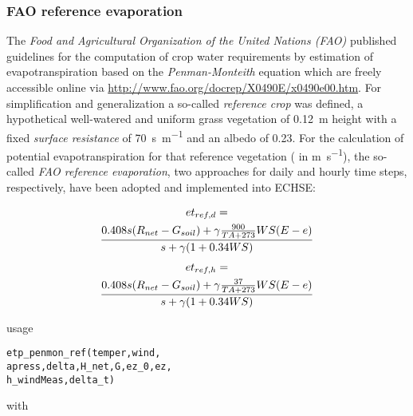 \subsubsection{FAO reference evaporation} \label{sec:et:fao_ref}
The \emph{Food and Agricultural Organization of the United Nations (FAO)} published guidelines for the computation of crop water requirements by estimation of evapotranspiration based on the \emph{Penman-Monteith} equation which are freely accessible online via \url{http://www.fao.org/docrep/X0490E/x0490e00.htm}. For simplification and generalization a so-called \emph{reference crop} was defined, a hypothetical well-watered and uniform grass vegetation of \SI{0.12}{\metre} height with a fixed \emph{surface resistance} of \SI{70}{\second\per\metre} and an albedo of \num{0.23}. For the calculation of potential evapotranspiration for that reference vegetation (\etRef{} in \si{\metre\per\second}), the so-called \emph{FAO reference evaporation}, two approaches for daily and hourly time steps, respectively, have been adopted and implemented into ECHSE:

\begin{multline} \label{eqn:et:fao_ref_d}
  et_{ref,d} = \\
  \frac{0.408 s{} (R_{net}{} - G_{soil}{}) + \gamma \frac{900}{TA + 273} WS (E{} - e{})}{s{} + \gamma{} (1 + 0.34 WS)}
\end{multline}
\begin{multline} \label{eqn:et:fao_ref_h}
  et_{ref,h} = \\
  \frac{0.408 s{} (R_{net}{} - G_{soil}{}) + \gamma \frac{37}{TA + 273} WS (E{} - e{})}{s{} + \gamma{} (1 + 0.34 WS)}
\end{multline}


\noindent
usage
\begin{verbatim}
etp_penmon_ref(temper,wind,
apress,delta,H_net,G,ez_0,ez,
h_windMeas,delta_t)
\end{verbatim}

\noindent
with\\ \vspace*{2ex}

